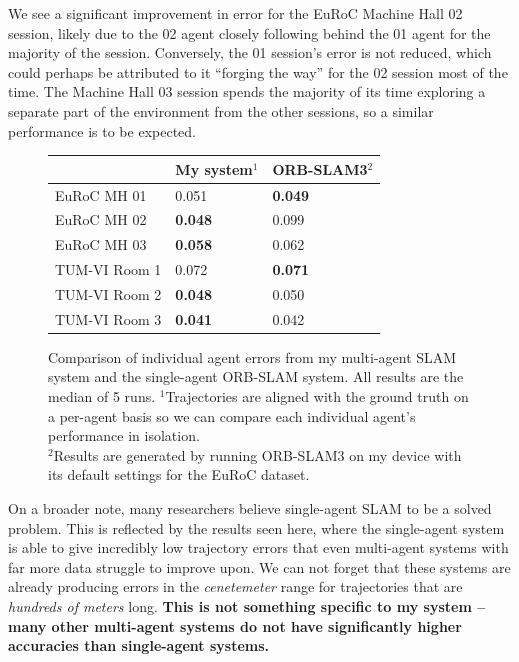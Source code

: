 We see a significant improvement in error for the EuRoC Machine Hall 02 session, likely due to the 02 agent closely following behind the 01 agent for the majority of the session. Conversely, the 01 session's error is not reduced, which could perhaps be attributed to it ``forging the way'' for the 02 session most of the time. The Machine Hall 03 session spends the majority of its time exploring a separate part of the environment from the other sessions, so a similar performance is to be expected.

\begin{figure}[h]
    \centering
    \def\arraystretch{1.2}
    \begin{tabular}{ |l|l|l| }
        \cline{2-3}
        \multicolumn{1}{c|}{} & My system$^1$  & ORB-SLAM3$^2$  \\
        \hline
        EuRoC MH 01           & 0.051          & \textbf{0.049} \\
        EuRoC MH 02           & \textbf{0.048} & 0.099          \\
        EuRoC MH 03           & \textbf{0.058} & 0.062          \\
        \hline
        TUM-VI Room 1         & 0.072          & \textbf{0.071} \\
        TUM-VI Room 2         & \textbf{0.048} & 0.050          \\
        TUM-VI Room 3         & \textbf{0.041} & 0.042          \\
        \hline
    \end{tabular}

    \caption{Comparison of individual agent errors from my multi-agent SLAM system and the single-agent ORB-SLAM system. All results are the median of 5 runs. \captionbreak $^1$Trajectories are aligned with the ground truth on a per-agent basis so we can compare each individual agent's performance in isolation. \\ $^2$Results are generated by running ORB-SLAM3 on my device with its default settings for the EuRoC dataset.}
    \label{fig:comparison-to-single-agent-systems}
\end{figure}

On a broader note, many researchers believe single-agent SLAM to be a solved problem. This is reflected by the results seen here, where the single-agent system is able to give incredibly low trajectory errors that even multi-agent systems with far more data struggle to improve upon. We can not forget that these systems are already producing errors in the \textit{cenetemeter} range for trajectories that are \textit{hundreds of meters} long. \textbf{This is not something specific to my system – many other multi-agent systems do not have significantly higher accuracies than single-agent systems.}

